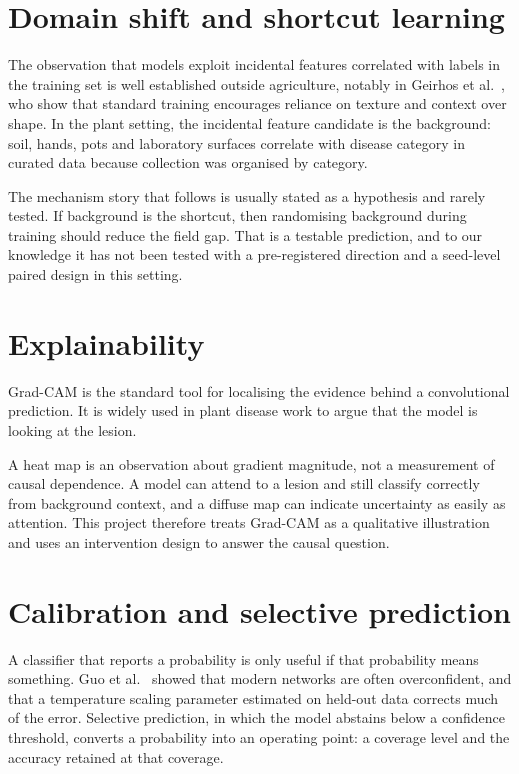 \section{Domain shift and shortcut learning}

The observation that models exploit incidental features correlated with labels in
the training set is well established outside agriculture, notably in Geirhos et
al.\ \cite{geirhos2020}, who show that standard training encourages reliance on
texture and context over shape. In the plant setting, the incidental feature
candidate is the background: soil, hands, pots and laboratory surfaces correlate
with disease category in curated data because collection was organised by category.

The mechanism story that follows is usually stated as a hypothesis and rarely
tested. If background is the shortcut, then randomising background during training
should reduce the field gap. That is a testable prediction, and to our knowledge it
has not been tested with a pre-registered direction and a seed-level paired design
in this setting.

\section{Explainability}

Grad-CAM \cite{selvaraju2017} is the standard tool for localising the evidence
behind a convolutional prediction. It is widely used in plant disease work to argue
that the model is looking at the lesion.

A heat map is an observation about gradient magnitude, not a measurement of causal
dependence. A model can attend to a lesion and still classify correctly from
background context, and a diffuse map can indicate uncertainty as easily as
attention. This project therefore treats Grad-CAM as a qualitative illustration and
uses an intervention design to answer the causal question.

\section{Calibration and selective prediction}

A classifier that reports a probability is only useful if that probability means
something. Guo et al.\ \cite{guo2017} showed that modern networks are often
overconfident, and that a temperature scaling parameter estimated on held-out data
corrects much of the error. Selective prediction, in which the model abstains below
a confidence threshold, converts a probability into an operating point: a coverage
level and the accuracy retained at that coverage.

